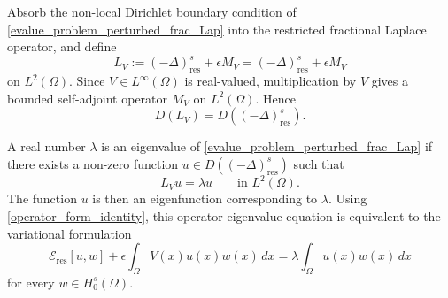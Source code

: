\documentclass[preprint,12pt]{elsarticle}
\newcommand{\R}{\mathbb R}
\begin{document}
Absorb the non-local Dirichlet boundary condition of
\eqref{evalue_problem_perturbed_frac_Lap} into the restricted fractional
Laplace operator, and define
\[
    L_V:=(-\Delta)^s_{\mathrm{res}}+\epsilon M_V
    =
    (-\Delta)^s_{\mathrm{res}}+\epsilon M_V
\]
on $L^2(\Omega)$. Since $V\in L^\infty(\Omega)$ is real-valued,
multiplication by $V$ gives a bounded self-adjoint operator $M_V$ on
$L^2(\Omega)$. Hence
\[
    D(L_V)=D((-\Delta)^s_{\mathrm{res}}).
\]

A real number $\lambda$ is an eigenvalue of
\eqref{evalue_problem_perturbed_frac_Lap} if there exists a non-zero
function $u\in D((-\Delta)^s_{\mathrm{res}})$ such that
\[
    L_Vu=\lambda u
    \qquad\text{in }L^2(\Omega).
\]
The function $u$ is then an eigenfunction corresponding to $\lambda$. Using \eqref{operator_form_identity}, this operator eigenvalue equation is
equivalent to the variational formulation
\begin{equation}\label{weak_form_perturbed_frac_lap}
    \mathcal E_{\mathrm{res}}[u,w]
    +
    \epsilon\int_\Omega V(x)u(x)w(x)\,dx
    =
    \lambda\int_\Omega u(x)w(x)\,dx
\end{equation}
for every $w\in H^s_0(\Omega)$.\\


\end{document}
